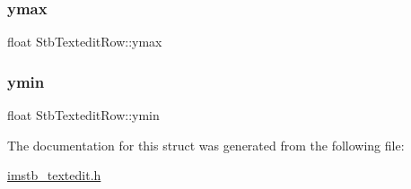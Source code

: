 \mbox{\label{struct_stb_textedit_row_aab290e15f6a3b4a96ab2c2472cc8a7a5}} 
\subsubsection{\texorpdfstring{ymax}{ymax}}
{\footnotesize\ttfamily float Stb\+Textedit\+Row\+::ymax}

\mbox{\label{struct_stb_textedit_row_a707d331bd9dc99d64c81f71106b75eed}} 
\subsubsection{\texorpdfstring{ymin}{ymin}}
{\footnotesize\ttfamily float Stb\+Textedit\+Row\+::ymin}



The documentation for this struct was generated from the following file\+:\begin{DoxyCompactItemize}
\item 
\mbox{\hyperlink{imstb__textedit_8h}{imstb\+\_\+textedit.\+h}}\end{DoxyCompactItemize}
